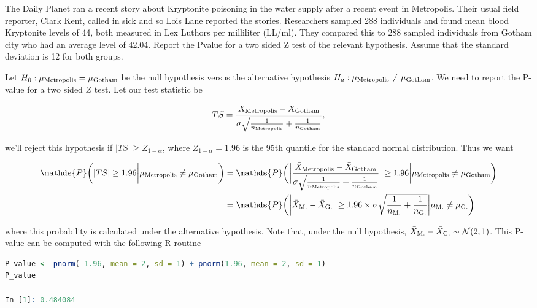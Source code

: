 \documentclass{homework}
\begin{document}
\begin{tcolorbox}[title=Question 9]
The Daily Planet ran a recent story about Kryptonite poisoning in the water supply after a recent event in Metropolis. Their usual field reporter, Clark Kent, called in sick and so Lois Lane reported the stories. Researchers sampled 288 individuals and found mean blood Kryptonite levels of 44, both measured in Lex Luthors per milliliter (LL/ml). They compared this to 288 sampled individuals from Gotham city who had an average level of 42.04. Report the Pvalue for a two sided Z test of the relevant hypothesis. Assume that the standard deviation is 12 for both groups. 
\end{tcolorbox}

Let $H_0 : \mu_{\textnormal{Metropolis}} = \mu_{\textnormal{Gotham}}$ be the null hypothesis versus the alternative hypothesis $H_a : \mu_{\textnormal{Metropolis}} \neq \mu_{\textnormal{Gotham}}$. We need to report the P-value for a two sided $Z$ test. Let our test statistic be

$$
TS = \frac{\bar{X}_{\textnormal{Metropolis}} - \bar{X}_{\textnormal{Gotham}} }{\sigma\sqrt{\frac{1}{n_{\textnormal{Metropolis}}} + \frac{1}{n_{\textnormal{Gotham}}}}},
$$

we'll reject this hypothesis if $|TS| \geq Z_{1-\alpha}$, where $Z_{1-\alpha} = 1.96$ is the 95th quantile for the standard normal distribution. Thus we want

\begin{align*}
\mathds{P}\bigg(|TS| \geq 1.96 \bigg| \mu_{\textnormal{Metropolis}} \neq \mu_{\textnormal{Gotham}} \bigg) &= \mathds{P}\bigg(\bigg|\frac{\bar{X}_{\textnormal{Metropolis}} - \bar{X}_{\textnormal{Gotham}} }{\sigma\sqrt{\frac{1}{n_{\textnormal{Metropolis}}} + \frac{1}{n_{\textnormal{Gotham}}}}}\bigg| \geq 1.96 \bigg| \mu_{\textnormal{Metropolis}} \neq \mu_{\textnormal{Gotham}}\bigg) \\
&= \mathds{P}\bigg(\bigg|\bar{X}_{\textnormal{M.}} - \bar{X}_{\textnormal{G.}}\bigg| \geq 1.96 \times \sigma\sqrt{\frac{1}{n_{\textnormal{M.}}} + \frac{1}{n_{\textnormal{G.}}}} \bigg| \mu_{\textnormal{M.}} \neq \mu_{\textnormal{G.}}\bigg)
\end{align*}

where this probability is calculated under the alternative hypothesis. Note that, under the null hypothesis, $\bar{X}_{\textnormal{M.}} - \bar{X}_{\textnormal{G.}} \sim \mathcal{N}(2,1)$. This P-value can be computed with the following R routine

\begin{lstlisting}[language=R]
P_value <- pnorm(-1.96, mean = 2, sd = 1) + pnorm(1.96, mean = 2, sd = 1)
P_value 

In [1]: 0.484084
\end{lstlisting}
\end{document}
